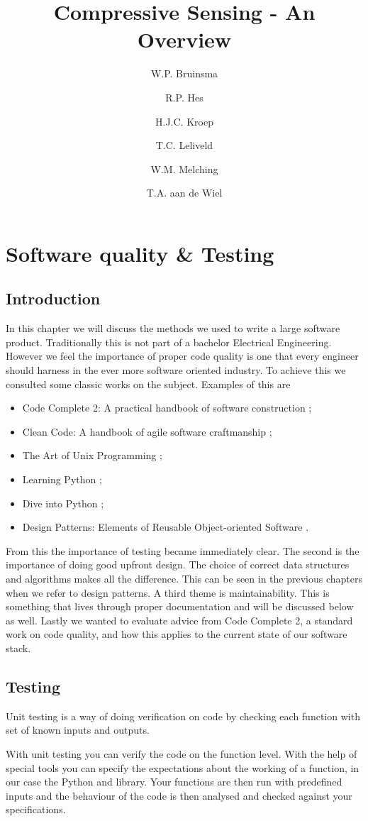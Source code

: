 \documentclass[a4paper, openany, oneside]{memoir}
\title{Compressive Sensing - An Overview}
\author{W.P. Bruinsma \and R.P. Hes \and H.J.C. Kroep \and T.C. Leliveld \and W.M. Melching \and T.A. aan de Wiel}
\begin{document}
\chapter{Software quality \& Testing}
\section{Introduction}
In this chapter we will discuss the methods we used to write a large software product. Traditionally this is not part of a bachelor Electrical Engineering. However we feel the importance of proper code quality is one that every engineer should harness in the ever more software oriented industry. To achieve this we consulted some classic works on the subject. Examples of this are
\begin{itemize}
    \item Code Complete 2: A practical handbook of software construction \cite{mcconnell2004code};
    \item Clean Code: A handbook of agile software craftmanship \cite{martin2008clean};
    \item The Art of Unix Programming \cite{raymond2003art};
    \item Learning Python \cite{lutz2013learning};
    \item Dive into Python \cite{pilgrim2000dive};
    \item Design Patterns: Elements of Reusable Object-oriented Software \cite{designpatterns}.
\end{itemize}
From this the importance of testing became immediately clear. The second is the importance of doing good upfront design. The choice of correct data structures and algorithms makes all the difference. This can be seen in the previous chapters when we refer to design patterns. A third theme is maintainability. This is something that lives through proper documentation and will be discussed below as well. Lastly we wanted to evaluate advice from Code Complete 2, a standard work on code quality, and how this applies to the current state of our software stack.

\section{Testing}
Unit testing is a way of doing verification on code by checking each function with set of known inputs and outputs.

With unit testing you can verify the code on the function level. With the help of special tools you can specify the expectations about the working of a function, in our case the Python  and  library. Your functions are then run with predefined inputs and the behaviour of the code is then analysed and checked against your specifications.
\end{document}
